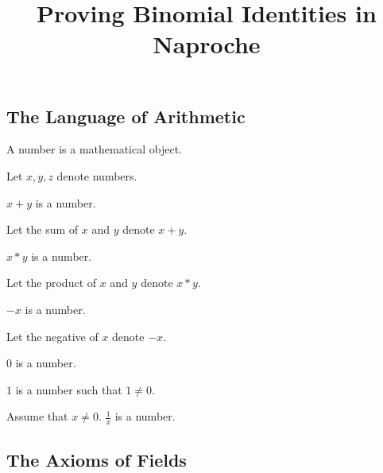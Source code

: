 \documentclass{article}
\title{Proving Binomial Identities in Naproche}
\begin{document}
\maketitle

\subsection*{The Language of Arithmetic}

\begin{forthel}
\begin{signature} A number is a mathematical object. 
\end{signature}
Let $x,y,z$ denote numbers.

\begin{signature} $x + y$ is a number.  
\end{signature}
Let the sum of $x$ and $y$ denote $x + y$.

\begin{signature} $x * y$ is a number. 
\end{signature}
Let the product of $x$ and $y$ denote $x * y$.

\begin{signature} $- x$ is a number. 
\end{signature}
Let the negative of $x$ denote $- x$.

\begin{signature} $0$ is a number.
\end{signature}

\begin{signature} $1$ is a number such that $1 \neq 0$.
\end{signature}

\begin{signature} Assume that $x \neq 0$. $\frac{1}{x}$ is a number.
\end{signature}
\end{forthel}

\subsection*{The Axioms of Fields}
\end{document}
